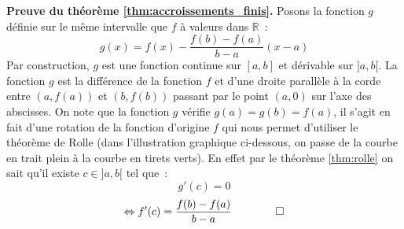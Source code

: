 \documentclass[10pt,notheorems]{beamer}
\theoremstyle{plain}
\theoremstyle{definition} %
\begin{document}
\begin{frame}
\begin{columns}[onlytextwidth]
\begin{column}{0.5\textwidth}
\begin{center}
{}
      \end{center}
    \end{column}
  \end{columns}
\end{frame}


\begin{notes}

  \textbf{Preuve du théorème \hyperlink{slide_accroissements_finis_1}{\ref{thm:accroissements_finis}}.} Posons la fonction $g$ définie sur le même intervalle que $f$ à valeurs dans $\mathbb R$~:
  \[
    g(x) = f(x)-\frac{f(b)-f(a)}{b-a}(x-a)
  \]
  Par construction, $g$ est une fonction continue sur $[a,b]$ et dérivable sur $]a,b[$. La fonction $g$ est la différence de la fonction $f$ et d'une droite parallèle à la corde entre $(a,f(a))$ et $(b,f(b))$ passant par le point $(a,0)$ sur l'axe des abscisses. On note que la fonction $g$ vérifie $g(a) = g(b) = f(a)$, il s'agit en fait d'une rotation de la fonction d'origine $f$ qui nous permet d'utiliser le théorème de Rolle (dans l'illustration graphique ci-dessous, on passe de la courbe en trait plein à la courbe en tirets verts). En effet par le théorème \hyperlink{slide_extrema_2}{\ref{thm:rolle}} on sait qu'il existe $c\in]a,b[$ tel que~:
  \[
    g'(c) = 0
  \]
  \[
    \Leftrightarrow f'(c) = \frac{f(b)-f(a)}{b-a}\quad\quad\qed
  \]


\end{notes}
\end{document}
